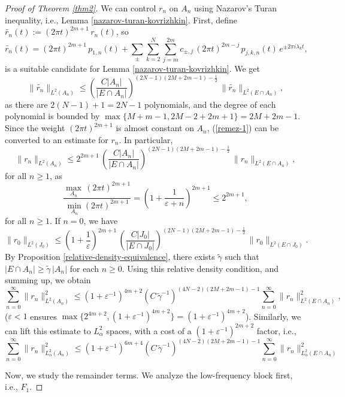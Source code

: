 \documentclass[11pt,a4paper,reqno,dvipsnames]{amsart}
\newcommand{\ep}{\varepsilon}
\renewcommand{\ge}{\geqslant}
\renewcommand{\le}{\leqslant}
\numberwithin{equation}{section}
\theoremstyle{plain}
\theoremstyle{definition}
\theoremstyle{remark}
\begin{document}
\begin{proof}[Proof of Theorem \ref{thm2}]
We can control $r_n$ on $A_n$ using Nazarov's Turan inequality, i.e., Lemma \ref{nazarov-turan-kovrizhkin}. First, define $\widetilde{r_n}(t) := (2\pi t)^{2m+1}\, r_n(t)$, so
$$\widetilde{r_n}(t) = (2\pi t)^{2m+1}\,p_{1,n}(t) + \sum_{\pm} \sum_{k=2}^N \sum_{j=m}^{2m} c_{\pm, j}\,(2\pi t)^{2m-j}\,  p_{j,k,n}(t)\, e^{\pm 2\pi i\lambda_k t},$$
is a suitable candidate for Lemma \ref{nazarov-turan-kovrizhkin}. We get
\begin{equation}
\label{remez-1}
    \|\widetilde{r_n}\|_{L^2(A_n)} \le \left(\frac{C|A_n|}{|E\cap A_n|} \right)^{(2N-1)(2M + 2m - 1) - \frac{1}{2}}\, \|\widetilde{r_n}\|_{L^2(E\cap A_n)},
\end{equation}
as there are $2(N-1) + 1 = 2N-1$ polynomials, and the degree of each polynomial is bounded by $\max\{M + m-1, 2M-2 + 2m+1\} = 2M + 2m - 1$. Since the weight $(2\pi t)^{2m+1}$ is almost constant on $A_n$, (\ref{remez-1}) can be converted to an  estimate for $r_n$. In particular,
\begin{equation}
\label{remez-2}
    \|{r_n}\|_{L^2(A_n)} \le 2^{2m+1}\, \left(\frac{C|A_n|}{|E\cap A_n|} \right)^{(2N-1)(2M + 2m - 1) - \frac{1}{2}}\, \|{r_n}\|_{L^2(E\cap A_n)},
\end{equation}
for all $n\ge 1$, as 
$$\frac{\max_{A_n}\, (2\pi t)^{2m+1}}{\min_{A_n} (2\pi t)^{2m+1}}  = \left(1 + \frac{1}{\ep + n} \right)^{2m+1} \le 2^{2m+1},$$
for all $n \ge 1$. If $n = 0$, we have
\begin{equation}
\label{remez-3}
    \|{r_0}\|_{L^2(J_0)} \le \left(1 + \frac{1}{\ep} \right)^{2m+1}\, \left(\frac{C|J_0|}{|E\cap J_0|} \right)^{(2N-1)(2M + 2m - 1) - \frac{1}{2}}\, \|{r_0}\|_{L^2(E\cap J_0)}.
\end{equation}
By Proposition \ref{relative-density-equivalence}, there exists $\widetilde{\gamma}$ such that $|E \cap A_n| \ge \widetilde{\gamma}\, |A_n|$ for each $n \ge 0$. Using this relative density condition, and summing up, we obtain
$$\sum_{n=0}^\infty \|r_n\|^2_{L^2(A_n)} \le (1 + \ep^{-1})^{4m+2}\left(C\,\widetilde\gamma^{-1} \right)^{(4N-2)(2M + 2m - 1) - 1} \sum_{n=0}^\infty  \|{r_n}\|_{L^2(E\cap A_n)}^2,$$
($\ep < 1$ ensures $\max \{2^{4m+2}, (1 + \ep^{-1})^{4m+2}\} = (1 + \ep^{-1})^{4m+2}$). Similarly, we can lift this estimate to $L^2_\alpha$ spaces, with a cost of a $(1 + \ep^{-1})^{2m+2}$ factor, i.e., 
$$\sum_{n=0}^\infty \|r_n\|^2_{L^2_\alpha(A_n)} \le (1 + \ep^{-1})^{6m+4}\left(C\,\widetilde\gamma^{-1} \right)^{(4N-2)(2M + 2m - 1) - 1} \sum_{n=0}^\infty  \|{r_n}\|_{L^2_\alpha(E\cap A_n)}^2$$

Now, we study the remainder terms. We analyze the low-frequency block first, i.e., $F_1$. 


\end{proof}
\end{document}
